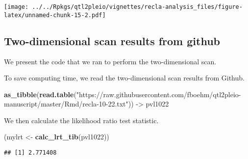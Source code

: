 \documentclass{book}
\newenvironment{Shaded}{\begin{snugshade}}{\end{snugshade}}
\newcommand{\DataTypeTok}[1]{\textcolor[rgb]{0.13,0.29,0.53}{#1}}
\newcommand{\DecValTok}[1]{\textcolor[rgb]{0.00,0.00,0.81}{#1}}
\newcommand{\KeywordTok}[1]{\textcolor[rgb]{0.13,0.29,0.53}{\textbf{#1}}}
\newcommand{\NormalTok}[1]{#1}
\newcommand{\OperatorTok}[1]{\textcolor[rgb]{0.81,0.36,0.00}{\textbf{#1}}}
\newcommand{\StringTok}[1]{\textcolor[rgb]{0.31,0.60,0.02}{#1}}
\begin{document}
\texttt{[image: ../../Rpkgs/qtl2pleio/vignettes/recla-analysis\_files/figure-latex/unnamed-chunk-15-2.pdf]}

\hypertarget{two-dimensional-scan-results-from-github}{%
\subsection{Two-dimensional scan results from
github}\label{two-dimensional-scan-results-from-github}}

We present the code that we ran to perform the two-dimensional scan.

\begin{Shaded}
\end{Shaded}

To save computing time, we read the two-dimensional scan results from
Github.

\begin{Shaded}
\begin{Highlighting}[]
\KeywordTok{as_tibble}\NormalTok{(}\KeywordTok{read.table}\NormalTok{(}\StringTok{"https://raw.githubusercontent.com/fboehm/qtl2pleio-manuscript/master/Rmd/recla-10-22.txt"}\NormalTok{)) ->}\StringTok{ }\NormalTok{pvl1022}
\end{Highlighting}
\end{Shaded}

We then calculate the likelihood ratio test statistic.

\begin{Shaded}
\begin{Highlighting}[]
\NormalTok{(mylrt <-}\StringTok{ }\KeywordTok{calc_lrt_tib}\NormalTok{(pvl1022))}
\end{Highlighting}
\end{Shaded}

\begin{verbatim}
## [1] 2.771408
\end{verbatim}
\end{document}
